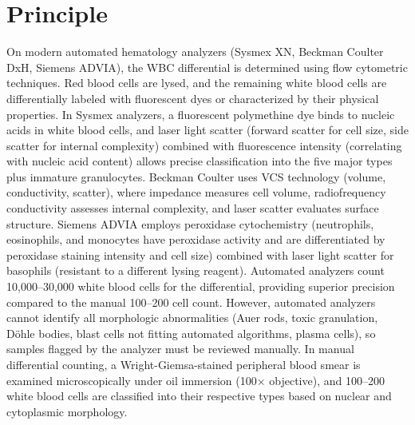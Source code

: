 \section*{Principle}
On modern automated hematology analyzers (Sysmex XN, Beckman Coulter DxH, Siemens ADVIA), the WBC differential is determined using flow cytometric techniques. Red blood cells are lysed, and the remaining white blood cells are differentially labeled with fluorescent dyes or characterized by their physical properties. In Sysmex analyzers, a fluorescent polymethine dye binds to nucleic acids in white blood cells, and laser light scatter (forward scatter for cell size, side scatter for internal complexity) combined with fluorescence intensity (correlating with nucleic acid content) allows precise classification into the five major types plus immature granulocytes. Beckman Coulter uses VCS technology (volume, conductivity, scatter), where impedance measures cell volume, radiofrequency conductivity assesses internal complexity, and laser scatter evaluates surface structure. Siemens ADVIA employs peroxidase cytochemistry (neutrophils, eosinophils, and monocytes have peroxidase activity and are differentiated by peroxidase staining intensity and cell size) combined with laser light scatter for basophils (resistant to a different lysing reagent). Automated analyzers count 10,000--30,000 white blood cells for the differential, providing superior precision compared to the manual 100--200 cell count. However, automated analyzers cannot identify all morphologic abnormalities (Auer rods, toxic granulation, D\"{o}hle bodies, blast cells not fitting automated algorithms, plasma cells), so samples flagged by the analyzer must be reviewed manually. In manual differential counting, a Wright-Giemsa-stained peripheral blood smear is examined microscopically under oil immersion (100$\times$ objective), and 100--200 white blood cells are classified into their respective types based on nuclear and cytoplasmic morphology.

